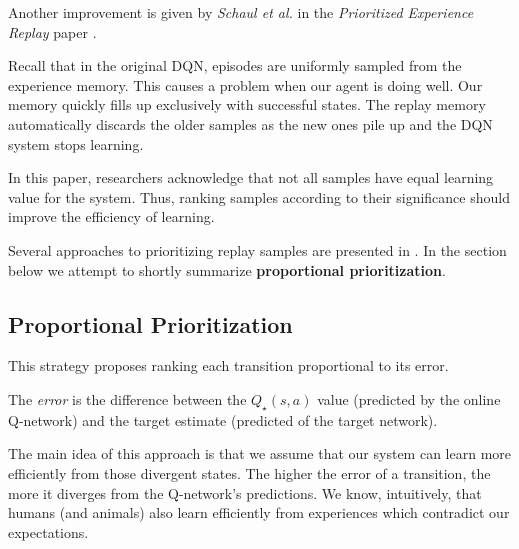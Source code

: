 Another improvement is given by \emph{Schaul et al.} in the \emph{Prioritized Experience Replay} paper \cite{per-paper}.

Recall that in the original DQN, episodes are uniformly sampled from the experience memory.
This causes a problem when our agent is doing well.
Our memory quickly fills up exclusively with successful states.
The replay memory automatically discards the older samples as the new ones pile up and the DQN system stops learning.

In this paper, researchers acknowledge that not all samples have equal learning value for the system.
Thus, ranking samples according to their significance should improve the efficiency of learning.

Several approaches to prioritizing replay samples are presented in \cite{per-paper}. In the section below we attempt to shortly summarize \textbf{proportional prioritization}.

\subsection{Proportional Prioritization}

This strategy proposes ranking each transition proportional to its error.

The \emph{error} is the difference between the \(Q_{\star}(s, a)\)  value (predicted by the online Q-network) and the target estimate (predicted of the target network).

The main idea of this approach is that we assume that our system can learn more efficiently from those divergent states.
The higher the error of a transition, the more it diverges from the Q-network's predictions.
We know, intuitively, that humans (and animals) also learn efficiently from experiences which contradict our expectations.